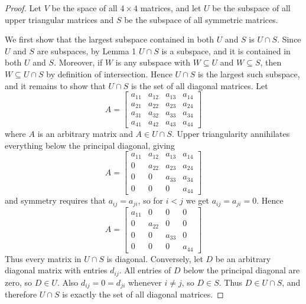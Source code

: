 \documentclass{article}
\begin{document}
\begin{proof}
    Let $V$ be the space of all $4 \times 4$ matrices, and let $U$ be the subspace of all upper triangular 
    matrices and $S$ be the subspace of all symmetric matrices.
    
    \medskip

    We first show that the largest subspace contained in both $U$ and $S$ is $U \cap S$. Since $U$ and $S$ are 
    subspaces, by Lemma 1 $U \cap S$ is a subspace, and it is contained in both $U$ and $S$. Moreover, if $W$ is 
    any subspace with $W \subseteq U$ and $W \subseteq S$, then $W \subseteq U \cap S$ by definition of 
    intersection. Hence $U \cap S$ is the largest such subspace, and it remains to show that $U \cap S$ is the 
    set of all diagonal matrices. Let
    \[
    A = \begin{bmatrix}
        a_{11} & a_{12} & a_{13} & a_{14} \\
        a_{21} & a_{22} & a_{23} & a_{24} \\
        a_{31} & a_{32} & a_{33} & a_{34} \\
        a_{41} & a_{42} & a_{43} & a_{44}
    \end{bmatrix}
    \]
    where $A$ is an arbitrary matrix and $A \in U \cap S$. Upper triangularity annihilates everything below the 
    principal diagonal, giving 
    \[
    A = \begin{bmatrix}
        a_{11} & a_{12} & a_{13} & a_{14} \\
        0 & a_{22} & a_{23} & a_{24} \\
        0 & 0 & a_{33} & a_{34} \\
        0 & 0 & 0 & a_{44}
    \end{bmatrix}
    \]
    and symmetry requires that $a_{ij} = a_{ji}$, so for $i < j$ we get $a_{ij} = a_{ji} = 0$. Hence
    \[
    A = \begin{bmatrix}
        a_{11} & 0 & 0 & 0 \\
        0 & a_{22} & 0 & 0 \\
        0 & 0 & a_{33} & 0 \\
        0 & 0 & 0 & a_{44}
    \end{bmatrix}
    \]
    Thus every matrix in $U \cap S$ is diagonal. Conversely, let $D$ be an arbitrary diagonal matrix with 
    entries $d_{ij}$. All entries of $D$ below the principal diagonal are zero, so $D \in U$. Also 
    $d_{ij} = 0 = d_{ji}$ whenever $i \neq j$, so $D \in S$. Thus $D \in U \cap S$, and therefore $U \cap S$ is 
    exactly the set of all diagonal matrices.


\end{proof}
\end{document}
